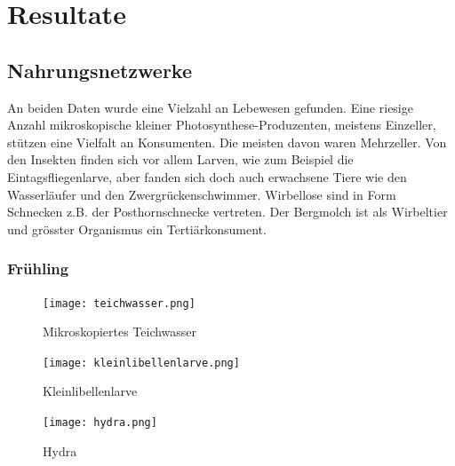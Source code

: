 \documentclass{article}
\begin{document}
\section{Resultate}
    
    \subsection{Nahrungsnetzwerke}
        
        An beiden Daten wurde eine Vielzahl an Lebewesen gefunden. Eine riesige Anzahl mikroskopische kleiner Photosynthese-Produzenten, meistens Einzeller, stützen eine Vielfalt an Konsumenten. Die meisten davon waren Mehrzeller. Von den Insekten finden sich vor allem Larven, wie zum Beispiel die Eintagsfliegenlarve, aber fanden sich doch auch erwachsene Tiere wie den Wasserläufer und den Zwergrückenschwimmer. Wirbellose sind in Form Schnecken z.B. der Posthornschnecke vertreten. Der Bergmolch ist als Wirbeltier und grösster Organismus ein Tertiärkonsument.
        
    
        \subsubsection{Frühling}
            
            \begin{figure}[H]
            \centering
            \texttt{[image: teichwasser.png]}
            \caption{Mikroskopiertes Teichwasser}
            \label{fig:universe}
            \end{figure}
            
            \begin{figure}[H]
            \centering
            \texttt{[image: kleinlibellenlarve.png]}
            \caption{Kleinlibellenlarve}
            \label{fig:universe}
            \end{figure}
            
            \begin{figure}[h!]
            \centering
            \texttt{[image: hydra.png]}
            \caption{Hydra}
            \label{fig:universe}
            \end{figure}
            
            \newpage
            
\end{document}
